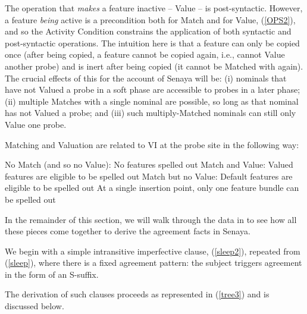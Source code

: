 \documentclass[output=paper
,modfonts
,nonflat]{langsci/langscibook}
\begin{document}
\noindent The operation that \textit{makes} a feature inactive -- Value -- is post-syntactic. However, a feature \textit{being} active is a precondition both for Match and for Value, (\ref{OPS2}), and so the Activity Condition constrains the application of both syntactic and post-syntactic operations. The intuition here is that a feature can only be copied once \citep{Bejar03} (after being copied, a feature cannot be copied again, i.e., cannot Value another probe) and is inert after being copied (it cannot be Matched with again). The crucial effects of this for the account of Senaya will be: (i) nominals that have not Valued a probe in a soft phase are accessible to probes in a later phase; (ii) multiple Matches with a single nominal are possible, so long as that nominal has not Valued a probe; and (iii) such multiply-Matched nominals can still only Value one probe.

Matching and Valuation are related to VI at the probe site in the following way: 

\eal
\ex No Match (and so no Value): No features spelled out\footnotemark
\ex Match and Value: Valued features are eligible to be spelled out
\ex Match but no Value: Default features are eligible to be spelled out
\ex At a single insertion point, only one feature bundle can be spelled out
\zl 


\noindent In the remainder of this section, we will walk through the data in  to see how all these pieces come together to derive the agreement facts in Senaya. 

We begin with a simple intransitive imperfective clause, (\ref{sleep2}), repeated from (\ref{sleep}), where there is a fixed agreement pattern: the subject triggers agreement in the form of an S-suffix.

\z

\noindent The derivation of such clauses proceeds as represented in (\ref{tree3}) and is discussed below.\largerpage[1.5]
\end{document}
